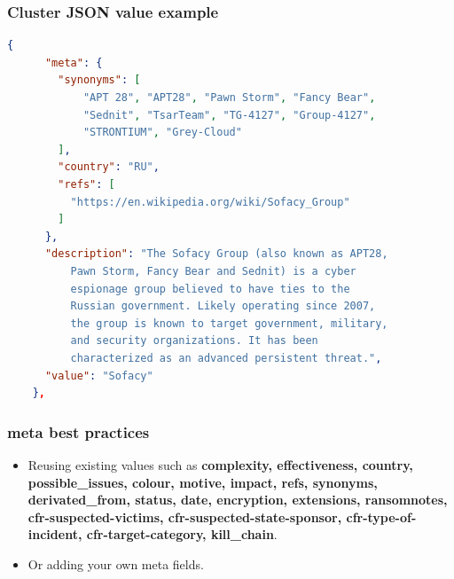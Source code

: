 \begin{frame}[fragile]
	\frametitle{Cluster JSON value example}
    \begin{adjustbox}{keepaspectratio}
        \begin{lstlisting}[language=json,firstnumber=1]
    {
      "meta": {
        "synonyms": [
            "APT 28", "APT28", "Pawn Storm", "Fancy Bear",
            "Sednit", "TsarTeam", "TG-4127", "Group-4127",
            "STRONTIUM", "Grey-Cloud"
        ],
        "country": "RU",
        "refs": [
          "https://en.wikipedia.org/wiki/Sofacy_Group"
        ]
      },
      "description": "The Sofacy Group (also known as APT28,
          Pawn Storm, Fancy Bear and Sednit) is a cyber
          espionage group believed to have ties to the
          Russian government. Likely operating since 2007,
          the group is known to target government, military,
          and security organizations. It has been
          characterized as an advanced persistent threat.",
      "value": "Sofacy"
    },

        \end{lstlisting}
    \end{adjustbox}
\end{frame}

\begin{frame}[fragile]
        \frametitle{meta best practices}
        \begin{itemize}
        \item Reusing existing values such as {\bf complexity, effectiveness, country, possible\_issues, colour, motive, impact, refs, synonyms, derivated\_from, status, date, encryption, extensions, ransomnotes, cfr-suspected-victims, cfr-suspected-state-sponsor, cfr-type-of-incident, cfr-target-category, kill\_chain}.
        \item Or adding your own meta fields.
        \end{itemize}
\end{frame}

